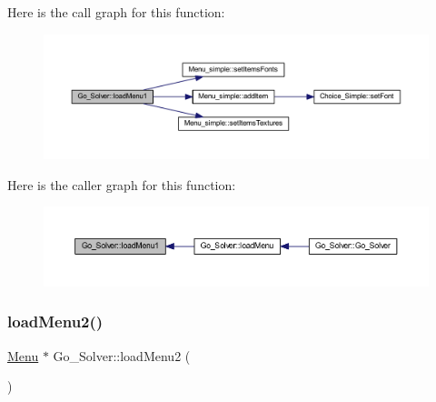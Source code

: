 Here is the call graph for this function\+:
\nopagebreak
\begin{figure}[H]
\begin{center}
\leavevmode
\includegraphics[width=350pt]{class_go___solver_aefc904642aa7fcc3a5f700f921b9c0ab_cgraph}
\end{center}
\end{figure}
Here is the caller graph for this function\+:
\nopagebreak
\begin{figure}[H]
\begin{center}
\leavevmode
\includegraphics[width=350pt]{class_go___solver_aefc904642aa7fcc3a5f700f921b9c0ab_icgraph}
\end{center}
\end{figure}
\mbox{\label{class_go___solver_acbb6d35d88e5c9bb05ceaae81db6287c}} 
\subsubsection{\texorpdfstring{load\+Menu2()}{loadMenu2()}}
{\footnotesize\ttfamily \hyperlink{class_menu}{Menu} $\ast$ Go\+\_\+\+Solver\+::load\+Menu2 (\begin{DoxyParamCaption}{ }\end{DoxyParamCaption})\hspace{0.3cm}{\ttfamily [static]}}

